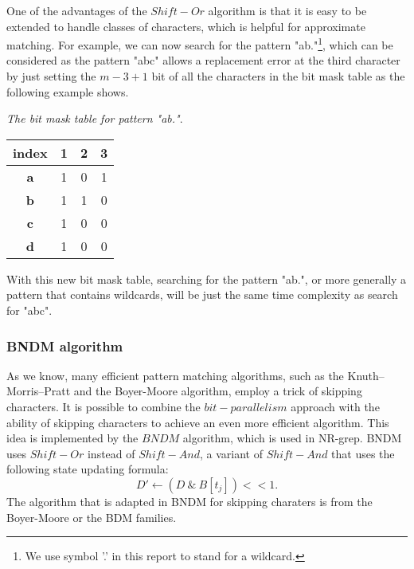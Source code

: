 One of the advantages of the $Shift-Or$ algorithm is that it is easy to be extended to handle classes of characters, which is helpful for approximate matching. 
For example, we can now search for the pattern "ab."\footnote{ We use symbol '.' in this report to stand for a wildcard.}, which can be considered as the pattern "abc" allows a replacement error at the third character by just setting the $m-3+1$ bit of all the characters in the bit mask table as the following example shows. 

\begin{example}\emph{The bit mask table for pattern "ab."}.
	\begin{table}[H]
		\centering
		\begin{tabular}{|c|c|c|c|}
			\hline
			index      & 1                        & 2                        & 3                        \\ \hline
			\textbf{a} & {\color{red} 1}                   & 0                        & {\color[HTML]{3531FF} 1} \\ \hline
			\textbf{b} &  {\color{red} 1}                    & {\color[HTML]{3531FF} 1} & 0                        \\ \hline
			\textbf{c} & {\color[HTML]{3531FF} 1} & 0                        & 0                        \\ \hline
			\textbf{d} &{\color{red} 1}                    & 0                        & 0                        \\ \hline
		\end{tabular}
		\label{table-bitmask2}
	\end{table}
\end{example}

With this new bit mask table, searching for the pattern "ab.", or more generally a pattern that contains wildcards, will be just the same time complexity as search for "abc". 
 
\subsubsection{BNDM algorithm}
As we know, many efficient pattern matching algorithms, such as the Knuth–Morris–Pratt and the Boyer-Moore algorithm, employ a trick of skipping characters. It is possible to combine the $bit-parallelism$ approach with the ability of skipping characters to achieve an even more efficient algorithm. This idea is implemented by the $BNDM$ algorithm, which is used in NR-grep. BNDM uses $Shift-Or$ instead of $Shift-And$, a variant of $Shift-And$ that uses the following state updating formula:  
$$ D' \leftarrow  (D \ \& \ B[t_j]) << 1 .$$ The algorithm that is adapted in BNDM for skipping charaters is from the Boyer-Moore or the BDM families\cite{crochemore1994text}.



